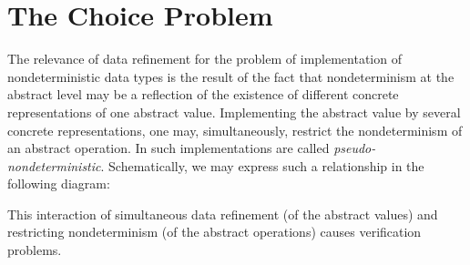 \section{The Choice Problem}\label{se:choiceproblem} The relevance of data refinement for the problem of implementation of nondeterministic data types is the result of the fact that nondeterminism at the abstract level may be a reflection of the existence of different concrete representations of one abstract value. Implementing the abstract value by several concrete representations, one may, simultaneously, restrict the nondeterminism of an abstract operation. In \cite{Sub} such implementations are called {\em pseudo-nondeterministic}. Schematically, we may express such a relationship in the following diagram: \begin{center}

\end{center}
This interaction of simultaneous data refinement (of the abstract values) and restricting nondeterminism (of the abstract operations) causes verification problems.

